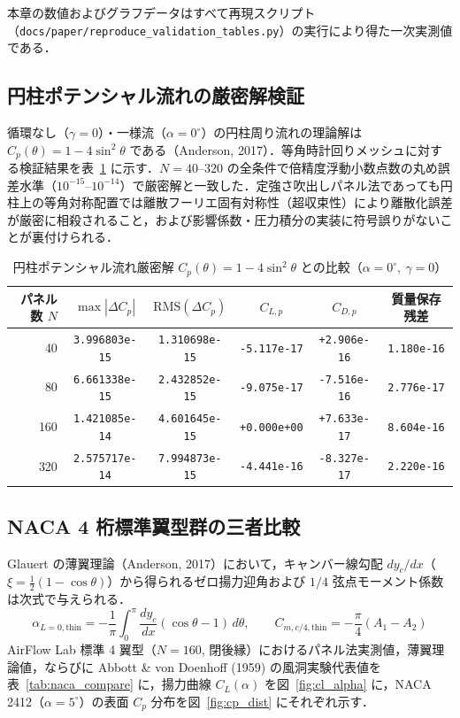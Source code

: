 \documentclass[10pt,a4paper]{article}
\begin{document}
本章の数値およびグラフデータはすべて再現スクリプト（\texttt{docs/paper/reproduce\_validation\_tables.py}）の実行により得た一次実測値である．

\subsection{円柱ポテンシャル流れの厳密解検証}
循環なし（$\gamma=0$）・一様流（$\alpha=0^\circ$）の円柱周り流れの理論解は $C_p(\theta)=1-4\sin^2\theta$ である（Anderson, 2017）．等角時計回りメッシュに対する検証結果を表~\ref{tab:cylinder} に示す．$N=40\text{--}320$ の全条件で倍精度浮動小数点数の丸め誤差水準（$10^{-15}\text{--}10^{-14}$）で厳密解と一致した．定強さ吹出しパネル法であっても円柱上の等角対称配置では離散フーリエ固有対称性（超収束性）により離散化誤差が厳密に相殺されること，および影響係数・圧力積分の実装に符号誤りがないことが裏付けられる．

\begin{table}[H]
  \centering
  \caption{円柱ポテンシャル流れ厳密解 $C_p(\theta)=1-4\sin^2\theta$ との比較（$\alpha=0^\circ,\ \gamma=0$）}
  \label{tab:cylinder}
  \small
  \renewcommand{\arraystretch}{1.28}
  \setlength{\tabcolsep}{7.5pt}
  \begin{tabular}{@{}rccccc@{}}
    \toprule
    パネル数 $N$ & $\max|\Delta C_p|$ & $\mathrm{RMS}(\Delta C_p)$ & $C_{L,p}$ & $C_{D,p}$ & 質量保存残差 \\
    \midrule
    40  & \texttt{3.996803e-15} & \texttt{1.310698e-15} & \texttt{-5.117e-17} & \texttt{+2.906e-16} & \texttt{1.180e-16} \\
    80  & \texttt{6.661338e-15} & \texttt{2.432852e-15} & \texttt{-9.075e-17} & \texttt{-7.516e-16} & \texttt{2.776e-17} \\
    160 & \texttt{1.421085e-14} & \texttt{4.601645e-15} & \texttt{+0.000e+00} & \texttt{+7.633e-17} & \texttt{8.604e-16} \\
    320 & \texttt{2.575717e-14} & \texttt{7.994873e-15} & \texttt{-4.441e-16} & \texttt{-8.327e-17} & \texttt{2.220e-16} \\
    \bottomrule
  \end{tabular}
\end{table}

\subsection{NACA 4 桁標準翼型群の三者比較}
Glauert の薄翼理論（Anderson, 2017）において，キャンバー線勾配 $dy_c/dx$（$\xi = \frac{1}{2}(1-\cos\theta)$）から得られるゼロ揚力迎角および $1/4$ 弦点モーメント係数は次式で与えられる．
\begin{equation}
  \alpha_{L=0,\mathrm{thin}} = -\frac{1}{\pi}\int_0^\pi \frac{dy_c}{dx}(\cos\theta - 1)\,d\theta,\qquad
  C_{m,c/4,\mathrm{thin}} = -\frac{\pi}{4}(A_1 - A_2)
\end{equation}
AirFlow Lab 標準 4 翼型（$N=160$, 閉後縁）におけるパネル法実測値，薄翼理論値，ならびに Abbott \& von Doenhoff (1959) の風洞実験代表値を表~\ref{tab:naca_compare} に，揚力曲線 $C_L(\alpha)$ を図~\ref{fig:cl_alpha} に，NACA 2412（$\alpha=5^\circ$）の表面 $C_p$ 分布を図~\ref{fig:cp_dist} にそれぞれ示す．
\end{document}

